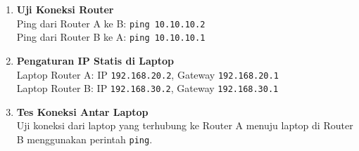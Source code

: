 \begin{enumerate}
    \item \textbf{Uji Koneksi Router} \\
    Ping dari Router A ke B: \texttt{ping 10.10.10.2} \\
    Ping dari Router B ke A: \texttt{ping 10.10.10.1}

    \item \textbf{Pengaturan IP Statis di Laptop} \\
    Laptop Router A: IP \texttt{192.168.20.2}, Gateway \texttt{192.168.20.1} \\
    Laptop Router B: IP \texttt{192.168.30.2}, Gateway \texttt{192.168.30.1}

    \item \textbf{Tes Koneksi Antar Laptop} \\
    Uji koneksi dari laptop yang terhubung ke Router A menuju laptop di Router B menggunakan perintah \texttt{ping}.
\end{enumerate}

